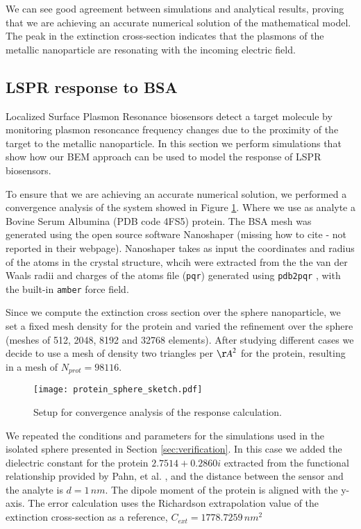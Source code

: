 We can see good agreement between simulations and analytical results, proving
that we are achieving an accurate numerical solution of the mathematical model. The 
peak in the extinction cross-section indicates that the plasmons of the metallic
nanoparticle are resonating with the incoming electric field.


\subsection{LSPR response to BSA} \label{sec:lspr_response}

Localized Surface Plasmon Resonance biosensors detect a target molecule by monitoring
plasmon resoncance frequency changes due to the proximity of the target to the metallic
nanoparticle. In this section we perform simulations that show how our BEM approach
can be used to model the response of LSPR biosensors.

To ensure that we are achieving an accurate numerical solution, we performed a 
convergence analysis of the system showed in Figure \ref{fig:setup_conv}. Where
we use as analyte a Bovine Serum Albumina (PDB code 4FS5) protein. The BSA mesh
was generated using the open source software Nanoshaper (missing how to cite - not
reported in their webpage). Nanoshaper takes as input the coordinates and radius
of the atoms in the crystal structure, whcih were extracted from the the van der
Waals radii and charges of the atoms file (\texttt{pqr}) generated using 
\texttt{pdb2pqr} \cite{Dolinsky04}, with the built-in \texttt{amber} force field.

Since we compute the extinction cross section over the sphere nanoparticle, we 
set a fixed mesh density for the protein and varied the refinement over the
sphere (meshes of 512, 2048, 8192 and 32768 elements). After studying different 
cases we decide to use a mesh of density two triangles per ${\AA}^2$ for 
the protein, resulting in a mesh of $N_{prot} = 98116$. 


\begin{figure}[h] %
   \centering
   \texttt{[image: protein\_sphere\_sketch.pdf]} 
   \caption{Setup for convergence analysis of the response calculation.}
   \label{fig:setup_conv}
\end{figure}

We repeated the conditions and parameters for the simulations used in the isolated
sphere presented in Section \ref{sec:verification}. In this case we added the 
dielectric constant for the protein $2.7514 + 0.2860i$ extracted from the 
functional relationship provided by Pahn, et al. \cite{PahnETal2013}, and the 
distance between the sensor and the analyte is $d=1 \, nm$.  The dipole moment 
of the protein is aligned with the y-axis. The error calculation
uses the Richardson extrapolation value of the extinction cross-section as a
reference, $C_{ext}= 1778.7259 \, nm^2$


